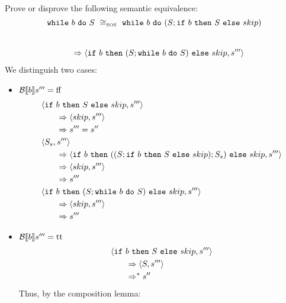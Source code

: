\begin{exercise}{
    Prove or disprove the following semantic equivalence:
    \[ \wwhile{b}{S}\ \SOScong\ \wwhile{b}{(S;\wif{b}{S}{skip})} \]
}
\begin{itemize}
\begin{itemize}
\begin{itemize}
\begin{align*}
                                \\&\qquad\Rightarrow \left<\texttt{if}\ b\ \texttt{then}\ (S; \texttt{while}\ b\ \texttt{do}\ S)\ \texttt{else}\ skip, s'''\right>
                            \end{align*}
                            We distinguish two cases:
                            \begin{itemize}
                                \item $\mathcal{B} \llbracket b \rrbracket s''' = \text{ff}$
                                    \begin{align*}
                                        &\left<\texttt{if}\ b\ \texttt{then}\ S\ \texttt{else}\ skip, s'''\right>
                                        \\&\qquad\Rightarrow \left<skip, s'''\right>
                                        \\&\qquad\Rightarrow s''' = s''
                                        \\
                                        &\left<S_s, s'''\right>
                                        \\&\qquad\Rightarrow \left<\texttt{if}\ b\ \texttt{then}\ ((S;\texttt{if}\ b\ \texttt{then}\ S\ \texttt{else}\ skip);S_s)\ \texttt{else}\ skip, s'''\right>
                                        \\&\qquad\Rightarrow \left<skip, s'''\right>
                                        \\&\qquad\Rightarrow s'''
                                        \\
                                        &\left<\texttt{if}\ b\ \texttt{then}\ (S; \texttt{while}\ b\ \texttt{do}\ S)\ \texttt{else}\ skip, s'''\right>
                                        \\&\qquad\Rightarrow \left<skip, s'''\right>
                                        \\&\qquad\Rightarrow s'''
                                    \end{align*}
                                \item $\mathcal{B} \llbracket b \rrbracket s''' = \text{tt}$
                                    \begin{align*}
                                        &\left<\texttt{if}\ b\ \texttt{then}\ S\ \texttt{else}\ skip, s'''\right>
                                        \\&\qquad\Rightarrow \left<S, s'''\right>
                                        \\&\qquad\Rightarrow^* s''
                                    \end{align*}
                                    Thus, by the composition lemma:
                                    \begin{align*}

\end{align*}
\end{itemize}
\end{itemize}
\end{itemize}
\end{itemize}
\end{exercise}
